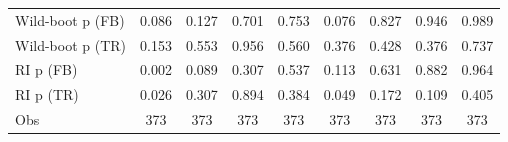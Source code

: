 {\begin{tabular}{l*{8}{c}}
Wild-boot p (FB)    &       0.086         &       0.127         &       0.701         &       0.753         &       0.076         &       0.827         &       0.946         &       0.989         \\
Wild-boot p (TR)    &       0.153         &       0.553         &       0.956         &       0.560         &       0.376         &       0.428         &       0.376         &       0.737         \\
RI p (FB)           &       0.002         &       0.089         &       0.307         &       0.537         &       0.113         &       0.631         &       0.882         &       0.964         \\
RI p (TR)           &       0.026         &       0.307         &       0.894         &       0.384         &       0.049         &       0.172         &       0.109         &       0.405         \\
Obs                 &         373         &         373         &         373         &         373         &         373         &         373         &         373         &         373         \\
\bottomrule
\end{tabular}
}
